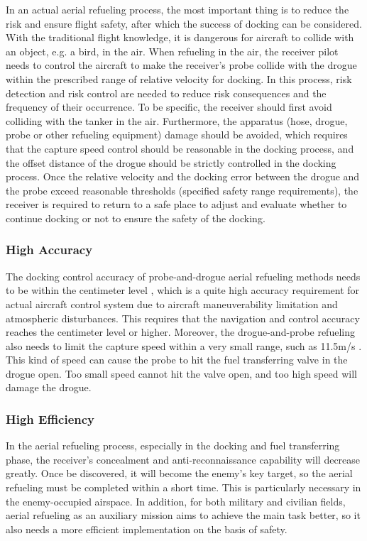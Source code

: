 In an actual aerial refueling process, the most important thing is
to reduce the risk and ensure flight safety, after which the success
of docking can be considered. With the traditional flight knowledge,
it is dangerous for aircraft to collide with an object, e.g. a bird,
in the air. When refueling in the air, the receiver pilot needs to
control the aircraft to make the receiver\textquoteright s probe collide
with the drogue within the prescribed range of relative velocity for
docking. In this process, risk detection and risk control are needed
to reduce risk consequences and the frequency of their occurrence.
To be specific, the receiver should first avoid colliding with the
tanker in the air. Furthermore, the apparatus (hose, drogue, probe
or other refueling equipment) damage should be avoided, which requires
that the capture speed control should be reasonable in the docking
process, and the offset distance of the drogue should be strictly
controlled in the docking process. Once the relative velocity and
the docking error between the drogue and the probe exceed reasonable
thresholds (specified safety range requirements), the receiver is
required to return to a safe place to adjust and evaluate whether
to continue docking or not to ensure the safety of the docking.

\subsubsection{High Accuracy}

The docking control accuracy of probe-and-drogue aerial refueling
methods needs to be within the centimeter level \cite{doebbler2007boom},
which is a quite high accuracy requirement for actual aircraft control
system due to aircraft maneuverability limitation and atmospheric
disturbances. This requires that the navigation and control accuracy
reaches the centimeter level or higher. Moreover, the drogue-and-probe
refueling also needs to limit the capture speed within a very small
range, such as 1\textendash 1.5m/s \cite{AAR-2014}. This kind of
speed can cause the probe to hit the fuel transferring valve in the
drogue open. Too small speed cannot hit the valve open, and too high
speed will damage the drogue.

\subsubsection{High Efficiency}

In the aerial refueling process, especially in the docking and fuel
transferring phase, the receiver\textquoteright s concealment and
anti-reconnaissance capability will decrease greatly. Once be discovered,
it will become the enemy's key target, so the aerial refueling must
be completed within a short time. This is particularly necessary in
the enemy-occupied airspace. In addition, for both military and civilian
fields, aerial refueling as an auxiliary mission aims to achieve the
main task better, so it also needs a more efficient implementation
on the basis of safety. 

